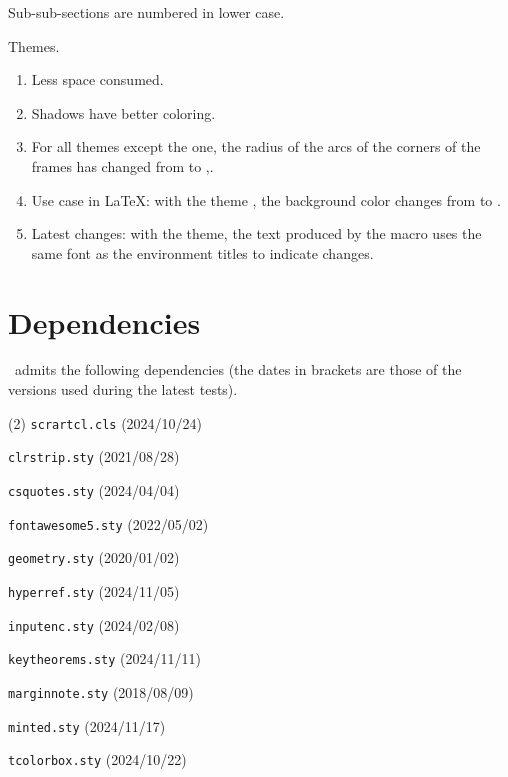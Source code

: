 {\begin{tdocupdate}
	\item Sub-sub-sections are numbered in lower case.

	\item Themes.
	\begin{enumerate}
		\item Less space consumed.

		\item Shadows have better coloring.

		\item For all themes except the  one, the radius of the arcs of the corners of the frames has changed from \tdoclatexin{.75mm} to \tdoclatexin{.2pt},.

 		\item Use case in \LaTeX: with the theme , the background color changes from  to .

		\item Latest changes: with the  theme, the \tdoclatexin{[Init]} text produced by the  macro uses the same font as the environment titles to indicate changes.
	\end{enumerate}
\end{tdocupdate}
}


\newpage
\tableofcontents
\newpage


\section{Dependencies}

\thisproj\ admits the following dependencies (the dates in brackets are those of the versions used during the latest tests).
%
\begin{tasks}[style=itemize](2)
    \task \texttt{scrartcl.cls}
    \hfill {\small (2024/10/24)}\kern10pt

    \task \texttt{clrstrip.sty}
    \hfill {\small (2021/08/28)}\kern10pt

    \task \texttt{csquotes.sty}
    \hfill {\small (2024/04/04)}\kern10pt

    \task \texttt{fontawesome5.sty}
    \hfill {\small (2022/05/02)}\kern10pt

    \task \texttt{geometry.sty}
    \hfill {\small (2020/01/02)}\kern10pt

    \task \texttt{hyperref.sty}
    \hfill {\small (2024/11/05)}\kern10pt

    \task \texttt{inputenc.sty}
    \hfill {\small (2024/02/08)}\kern10pt

    \task \texttt{keytheorems.sty}
    \hfill {\small (2024/11/11)}\kern10pt

    \task \texttt{marginnote.sty}
    \hfill {\small (2018/08/09)}\kern10pt

    \task \texttt{minted.sty}
    \hfill {\small (2024/11/17)}\kern10pt

    \task \texttt{tcolorbox.sty}
    \hfill {\small (2024/10/22)}\kern10pt
\end{tasks}


